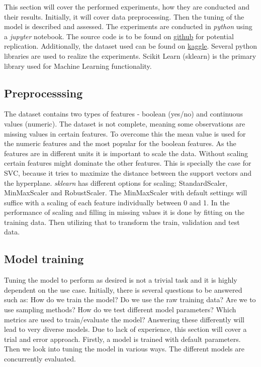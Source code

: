 This section will cover the performed experiments, how they are conducted and their results. Initially, it will cover data preprocessing. Then the tuning of the model is described and assessed. The experiments are conducted in \textit{python} using a \textit{jupyter} notebook. The source code is to be found on \href{https://github.com/mlRosenquist/au-mlr-computer-vision-and-ml/tree/master/project/notebook.ipynb}{github} for potential replication. Additionally, the dataset used can be found on \href{https://www.kaggle.com/competitions/au-ece-cvml2022/data}{kaggle}. Several python libraries are used to realize the experiments. Scikit Learn (sklearn)\cite{scikit-learn} is the primary library used for Machine Learning functionality.         


\subsection{Preprocesssing}
The dataset contains two types of features - boolean (yes/no) and continuous values (numeric). The dataset is not complete, meaning some observations are missing values in certain features. To overcome this the mean value is used for the numeric features and the most popular for the boolean features. As the features are in different units it is important to scale the data. Without scaling certain features might dominate the other features. This is specially the case for SVC, because it tries to maximize the distance between the support vectors and the hyperplane. \textit{sklearn} has different options for scaling; StandardScaler, MinMaxScaler and RobustScaler. The MinMaxScaler with default settings will suffice with a scaling of each feature individually between 0 and 1\cite{scikit-learn}. In the performance of scaling and filling in missing values it is done by fitting on the training data. Then utilizing that to transform the train, validation and test data. 

\subsection{Model training}
Tuning the model to perform as desired is not a trivial task and it is highly dependent on the use case. Initially, there is several questions to be answered such as: How do we train the model? Do we use the raw training data? Are we to use sampling methods? How do we test different model parameters? Which metrics are used to train/evaluate the model? Answering these differently will lead to very diverse models. Due to lack of experience, this section will cover a trial and error approach. Firstly, a model is trained with default parameters. Then we look into tuning the model in various ways. The different models are concurrently evaluated. \\

